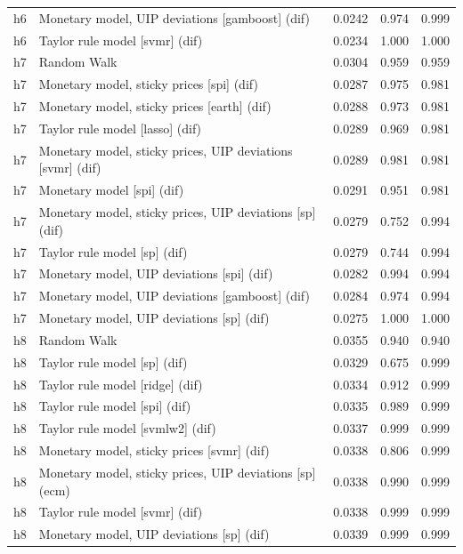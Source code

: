 \begin{ThreePartTable}
\begin{longtable}[t]{cp{5.5cm}ccc}
h6 & \raggedright Monetary model, UIP deviations [gamboost] (dif) & 0.0242 & 0.974 & 0.999\\
h6 & \raggedright Taylor rule model [svmr] (dif) & 0.0234 & 1.000 & 1.000\\
\addlinespace
h7 & \raggedright Random Walk & 0.0304 & 0.959 & 0.959\\
h7 & \raggedright Monetary model, sticky prices [spi] (dif) & 0.0287 & 0.975 & 0.981\\
h7 & \raggedright Monetary model, sticky prices [earth] (dif) & 0.0288 & 0.973 & 0.981\\
h7 & \raggedright Taylor rule model [lasso] (dif) & 0.0289 & 0.969 & 0.981\\
h7 & \raggedright Monetary model, sticky prices, UIP deviations [svmr] (dif) & 0.0289 & 0.981 & 0.981\\
h7 & \raggedright Monetary model [spi] (dif) & 0.0291 & 0.951 & 0.981\\
h7 & \raggedright Monetary model, sticky prices, UIP deviations [sp] (dif) & 0.0279 & 0.752 & 0.994\\
h7 & \raggedright Taylor rule model [sp] (dif) & 0.0279 & 0.744 & 0.994\\
h7 & \raggedright Monetary model, UIP deviations [spi] (dif) & 0.0282 & 0.994 & 0.994\\
h7 & \raggedright Monetary model, UIP deviations [gamboost] (dif) & 0.0284 & 0.974 & 0.994\\
h7 & \raggedright Monetary model, UIP deviations [sp] (dif) & 0.0275 & 1.000 & 1.000\\
\addlinespace
h8 & \raggedright Random Walk & 0.0355 & 0.940 & 0.940\\
h8 & \raggedright Taylor rule model [sp] (dif) & 0.0329 & 0.675 & 0.999\\
h8 & \raggedright Taylor rule model [ridge] (dif) & 0.0334 & 0.912 & 0.999\\
h8 & \raggedright Taylor rule model [spi] (dif) & 0.0335 & 0.989 & 0.999\\
h8 & \raggedright Taylor rule model [svmlw2] (dif) & 0.0337 & 0.999 & 0.999\\
h8 & \raggedright Monetary model, sticky prices [svmr] (dif) & 0.0338 & 0.806 & 0.999\\
h8 & \raggedright Monetary model, sticky prices, UIP deviations [sp] (ecm) & 0.0338 & 0.990 & 0.999\\
h8 & \raggedright Taylor rule model [svmr] (dif) & 0.0338 & 0.999 & 0.999\\
h8 & \raggedright Monetary model, UIP deviations [sp] (dif) & 0.0339 & 0.999 & 0.999\\

\end{longtable}
\end{ThreePartTable}
